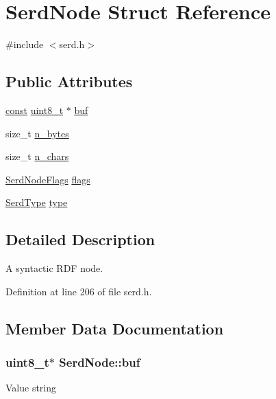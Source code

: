 \hypertarget{struct_serd_node}{}\section{Serd\+Node Struct Reference}
\label{struct_serd_node}


{\ttfamily \#include $<$serd.\+h$>$}

\subsection*{Public Attributes}
\begin{DoxyCompactItemize}
\item 
\hyperlink{getopt1_8c_a2c212835823e3c54a8ab6d95c652660e}{const} \hyperlink{lib-src_2ffmpeg_2win32_2stdint_8h_a9a941819355e6f658991890ff66b4b0e}{uint8\+\_\+t} $\ast$ \hyperlink{struct_serd_node_a50033bcc22d7a31e8515088ebf7d50ed}{buf}
\item 
size\+\_\+t \hyperlink{struct_serd_node_a64b294c408ae9387ffaa78a742196985}{n\+\_\+bytes}
\item 
size\+\_\+t \hyperlink{struct_serd_node_ad4816721933bbd19f904ff67d3beb40e}{n\+\_\+chars}
\item 
\hyperlink{group__serd_gafa75ae761bd7490db787b2f9e237595a}{Serd\+Node\+Flags} \hyperlink{struct_serd_node_a945891f8a5762a5739fc6ad7e023b50c}{flags}
\item 
\hyperlink{group__serd_ga7ccd8d4fb2c3a6ad690ed6d6fe1b45fa}{Serd\+Type} \hyperlink{struct_serd_node_ac415ada00df1883e7200cfa5c89b7fb9}{type}
\end{DoxyCompactItemize}


\subsection{Detailed Description}
A syntactic R\+DF node. 

Definition at line 206 of file serd.\+h.



\subsection{Member Data Documentation}
\subsubsection[{\texorpdfstring{buf}{buf}}]{ {\bf uint8\+\_\+t}$\ast$ Serd\+Node\+::buf}\hypertarget{struct_serd_node_a50033bcc22d7a31e8515088ebf7d50ed}{}\label{struct_serd_node_a50033bcc22d7a31e8515088ebf7d50ed}
Value string 

